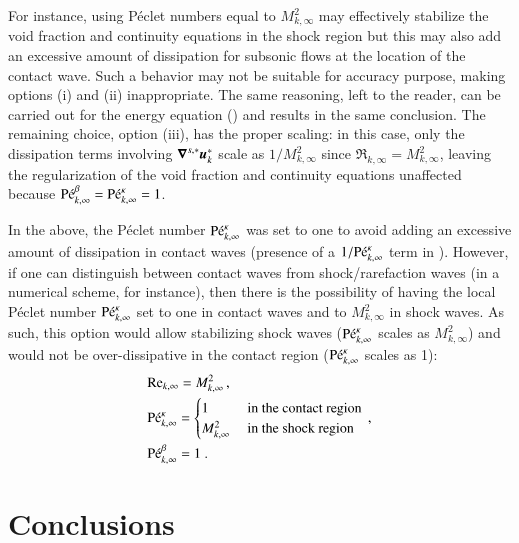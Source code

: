 \documentclass[preprint,10pt]{elsarticle}
\begin{document}
For instance, using P\'eclet numbers equal to $M_{k,\infty}^2$ may effectively stabilize the void fraction and continuity 
equations in the shock region but this may also add an excessive amount of dissipation for subsonic 
flows at the location of the contact wave. Such a behavior may not be suitable for accuracy purpose, 
making options (i) and (ii) inappropriate. The same reasoning, left to the reader, can be carried out 
for the energy equation () and results in the same conclusion. The remaining 
choice, option (iii), has the proper scaling: in this case, only the dissipation terms involving 
$\boldsymbol\nabla^{s,*} \boldsymbol u_k^*$ scale as $1/M_{k,\infty}^2$ since $\Re_{k,\infty} = M_{k,\infty}^2$, leaving the 
regularization of the void fraction and continuity equations unaffected because $\textrm{P\'e}_{k,\infty}^\beta = \textrm{P\'e}_{k,\infty}^\kappa =1$.
%
\begin{remark}
In the above, the P\'eclet number $\textrm{P\'e}_{k,\infty}^\kappa$ was set to one to avoid adding an excessive amount of dissipation in contact waves
(presence of a $1/\textrm{P\'e}_{k,\infty}^\kappa$ term in ). 
However, if one can distinguish between contact waves from shock/rarefaction waves (in a numerical scheme, for instance), then there is the possibility of having the local P\'eclet number $\textrm{P\'e}_{k,\infty}^\kappa$ set to one in contact waves and to $M^2_{k,\infty}$ in shock waves. 
As such, this option would allow stabilizing shock waves ($\textrm{P\'e}_{k,\infty}^\kappa$ scales as $M^2_{k,\infty}$) and would not be over-dissipative in the contact region ($\textrm{P\'e}_{k,\infty}^\kappa$ scales as 1):
%
\begin{align}
&\textrm{Re}_{k,\infty} = M_{k,\infty}^2 \,, \nonumber \\ 
& \textrm{P\'e}_{k,\infty}^\kappa = 
\begin{cases} 
1              & \mbox{ in the contact region} \\
M^2_{k,\infty} & \mbox{ in the shock region } 
\end{cases} \,,\nonumber \\ 
&\textrm{P\'e}_{k,\infty}^\beta = 1 \ . \nonumber
\end{align}
%
\end{remark}
%
\section{Conclusions}\label{sec:conclusion}
\end{document}
